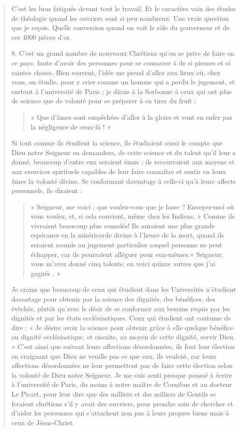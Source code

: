\begin{quote}
\begin{Synthesis}
C'est les bras fatigués devant tout le travail. Et le caractère vain des études de théologie quand les ouvriers sont si peu nombreux. Une vraie question que je reçois. 
Quelle conversion quand on voit le rôle du gouverneur et de ces 4000 pièces d'or.
\end{Synthesis}

8. C'est un grand nombre de nouveaux Chrétiens qu'on se prive
de faire en ce pays, faute d'avoir des personnes pour se consacrer
à de si pieuses et si saintes choses. Bien souvent, l'idée me prend
d'aller aux lieux où, chez vous, on étudie, pour y crier comme un
homme qui a perdu le jugement, et surtout à l'université de Paris ;
je dirais à la Sorbonne à ceux qui ont plus de science que de
volonté pour se préparer à en tirer du fruit : \begin{quote}
    « Que d'âmes sont
empêchées d'aller à la gloire et vont en enfer par la négligence de
ceux-là ! » 
\end{quote}Si tout comme ils étudient la science, ils étudiaient aussi
le compte que Dieu notre Seigneur en demandera, de cette science
et du talent qu'il leur a donné, beaucoup d'entre eux seraient
émus ; ils recourraient aux moyens et aux exercices spirituels capables
de leur faire connaître et sentir en leurs âmes la volonté divine.
Se conformant davantage à celle-ci qu'à leurs affects personnels,
ils diraient : \begin{quote}
    « Seigneur, me voici ; que voulez-vous que je fasse ?
Envoyez-moi où vous voulez, et, si cela convient, même chez les
Indiens. » Comme ils vivraient beaucoup plus consolés! Ils
auraient une plus grande espérance en la miséricorde divine à
     l'heure de la mort, quand ils seraient soumis au jugement particulier
auquel personne ne peut échapper, car ils pourraient alléguer
pour eux-mêmes:« Seigneur, vous m'avez donné cinq talents; en
voici quinze autres que j'ai gagnés . »
\end{quote} 
Je crains que beaucoup de
ceux qui étudient dans les Universités n'étudient davantage pour
obtenir par la science des dignités, des bénéfices, des évêchés, plutôt
qu'avec le désir de se conformer aux besoins requis par les dignités
et par les états ecclésiastiques. Ceux qui étudient ont coutume
de dire : « Je désire avoir la science pour obtenir grâce à elle quelque
bénéfice ou dignité ecclésiastique, et ensuite, au moyen de cette
dignité, servir Dieu. » C'est ainsi que suivant leurs affections désordonnées,
ils font leur élection en craignant que Dieu ne veuille pas
ce que eux, ils veulent, car leurs affections désordonnées ne leur
permettent pas de faire cette élection selon la volonté de Dieu notre
Seigneur. Je me suis senti presque poussé à écrire à l'université de
Paris, du moins à notre maître de Cornibus et au docteur Le
Picart, pour leur dire que des milliers et des milliers de Gentils
se feraient chrétiens s'il y avait des ouvriers, pour prendre soin de
chercher et d'aider les personnes qui s'attachent non pas à leurs
propres biens mais à ceux de Jésus-Christ.


\end{quote}
